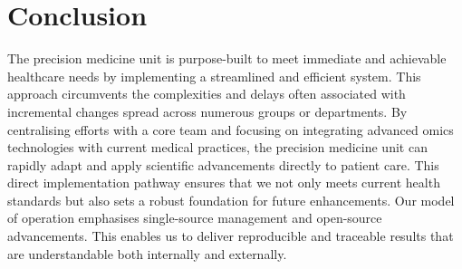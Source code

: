 \section{Conclusion}
The precision medicine unit is purpose-built to meet immediate and achievable healthcare needs by implementing a streamlined and efficient system. 
This approach circumvents the complexities and delays often associated with incremental changes spread across numerous groups or departments. 
By centralising efforts with a core team and focusing on integrating advanced omics technologies with current medical practices, the precision medicine unit can rapidly adapt and apply scientific advancements directly to patient care. 
This direct implementation pathway ensures that we not only meets current health standards but also sets a robust foundation for future enhancements.
Our model of operation emphasises single-source management and open-source advancements. 
This enables us to deliver reproducible and traceable results that are understandable both internally and externally.